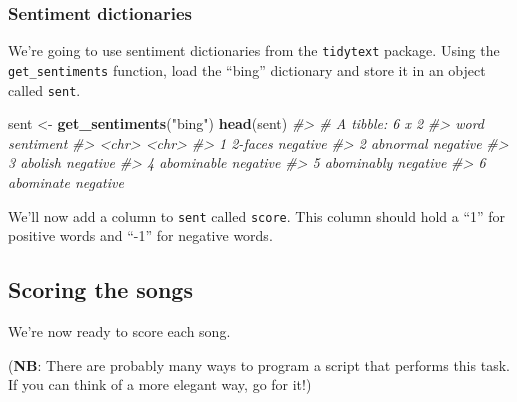 \documentclass[]{book}
\newenvironment{Shaded}{\begin{snugshade}}{\end{snugshade}}
\newcommand{\CommentTok}[1]{\textcolor[rgb]{0.56,0.35,0.01}{\textit{#1}}}
\newcommand{\DecValTok}[1]{\textcolor[rgb]{0.00,0.00,0.81}{#1}}
\newcommand{\KeywordTok}[1]{\textcolor[rgb]{0.13,0.29,0.53}{\textbf{#1}}}
\newcommand{\NormalTok}[1]{#1}
\newcommand{\OperatorTok}[1]{\textcolor[rgb]{0.81,0.36,0.00}{\textbf{#1}}}
\newcommand{\StringTok}[1]{\textcolor[rgb]{0.31,0.60,0.02}{#1}}
\begin{document}
\hypertarget{sentiment-dictionaries}{%
\subsubsection*{Sentiment dictionaries}\label{sentiment-dictionaries}}

We're going to use sentiment dictionaries from the \texttt{tidytext} package. Using the \texttt{get\_sentiments} function, load the ``bing'' dictionary and store it in an object called \texttt{sent}.

\begin{Shaded}
\begin{Highlighting}[]
\NormalTok{sent <-}\StringTok{ }\KeywordTok{get_sentiments}\NormalTok{(}\StringTok{"bing"}\NormalTok{)}
\KeywordTok{head}\NormalTok{(sent)}
\CommentTok{#> # A tibble: 6 x 2}
\CommentTok{#>   word       sentiment}
\CommentTok{#>   <chr>      <chr>    }
\CommentTok{#> 1 2-faces    negative }
\CommentTok{#> 2 abnormal   negative }
\CommentTok{#> 3 abolish    negative }
\CommentTok{#> 4 abominable negative }
\CommentTok{#> 5 abominably negative }
\CommentTok{#> 6 abominate  negative}
\end{Highlighting}
\end{Shaded}

We'll now add a column to \texttt{sent} called \texttt{score}. This column should hold a ``1'' for positive words and ``-1'' for negative words.

\begin{Shaded}
\end{Shaded}

\hypertarget{scoring-the-songs}{%
\subsection{Scoring the songs}\label{scoring-the-songs}}

We're now ready to score each song.

(\textbf{NB}: There are probably many ways to program a script that performs this task. If you can think of a more elegant way, go for it!)
\end{document}

